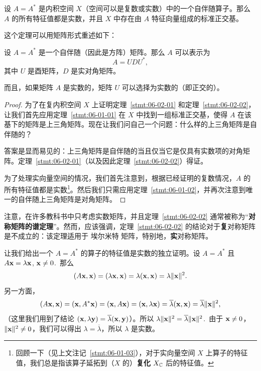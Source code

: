 \begin{theorem}\label{stmt:06-02-01} 设 $A = A^*$ 是内积空间 $X$（空间可以是复数或实数）中的一个自伴随算子。那么 $A$ 的所有特征值都是实数，并且 $X$ 中存在由 $A$ 特征向量组成的标准正交基。\end{theorem}

这个定理可以用矩阵形式重述如下：

\begin{theorem}\label{stmt:06-02-02} 设 $A = A^*$ 是一个自伴随（因此是方阵）矩阵。那么 $A$ 可以表示为
$$A = UDU^*,$$
其中 $U$ 是酉矩阵，$D$ 是实对角矩阵。

而且，如果矩阵 $A$ 是实数的，矩阵 $U$ 可以选择为实数的（即正交的）。\end{theorem}

\begin{proof}
为了在复内积空间 $X$ 上证明定理~\ref{stmt:06-02-01} 和定理~\ref{stmt:06-02-02}，让我们首先应用定理~\ref{stmt:06-01-01} 在 $X$ 中找到一组标准正交基，使得 $A$ 在该基下的矩阵是上三角矩阵。现在让我们问自己一个问题：什么样的上三角矩阵是自伴随的？

答案是显而易见的：上三角矩阵是自伴随的当且仅当它是仅具有实数项的对角矩阵。定理~\ref{stmt:06-02-01}（以及因此定理~\ref{stmt:06-02-02}）得证。

为了处理实向量空间的情况，我们首先注意到，根据已经证明的复数情况，$A$ 的所有特征值都是实数\footnote{回顾一下（见上文注记~\ref{stmt:06-01-03}），对于实向量空间 $X$ 上算子的特征值，我们总是指该算子延拓到（$X$ 的）\textbf{复化} $X_{\mathbb{C}}$ 后的特征值。}。然后我们只需应用定理~\ref{stmt:06-01-02}，并再次注意到唯一的自伴随上三角矩阵是对角矩阵。
\end{proof}

\begin{remark*}
注意，在许多教科书中只考虑实数矩阵，并且定理~\ref{stmt:06-02-02} 通常被称为“\textbf{对称矩阵的谱定理}”。然而，应该强调，定理~\ref{stmt:06-02-02} 的结论对于\textbf{复}对称矩阵是不成立的：该定理适用于 埃尔米特 矩阵，特别地，\textbf{实}对称矩阵。
\end{remark*}

让我们给出一个 $A=A^*$ 的算子的特征值是实数的独立证明。设 $A=A^*$ 且 $A\mathbf{x}=\lambda \mathbf{x}$, $\mathbf{x} \neq 0$.~那么
$$(A\mathbf{x}, \mathbf{x}) = (\lambda \mathbf{x}, \mathbf{x}) = \lambda(\mathbf{x}, \mathbf{x}) = \lambda\|\mathbf{x}\|^2.$$
另一方面，
$$(A\mathbf{x}, \mathbf{x}) = (\mathbf{x}, A^*\mathbf{x}) = (\mathbf{x}, A\mathbf{x}) = (\mathbf{x}, \lambda \mathbf{x}) = \overline{\lambda}(\mathbf{x}, \mathbf{x}) = \overline{\lambda}\|\mathbf{x}\|^2,$$（这里我们用到了结论 $(\mathbf{x}, \lambda \mathbf{y}) = \overline{\lambda}(\mathbf{x}, \mathbf{y})$）。所以 $\lambda\|\mathbf{x}\|^2 = \overline{\lambda}\|\mathbf{x}\|^2$.~由于 $\mathbf{x} \neq 0$，$\|\mathbf{x}\|^2 \neq 0$，我们可以得出 $\lambda = \overline{\lambda}$，所以 $\lambda$ 是实数。

